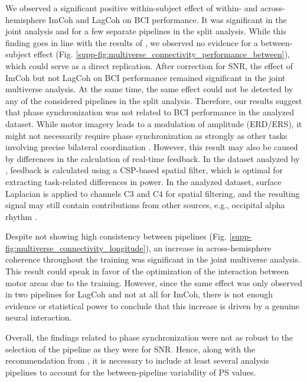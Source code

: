 We observed a significant positive within-subject effect of within- and across-hemisphere ImCoh and LagCoh on BCI performance. It was significant in the joint analysis and for a few separate pipelines in the split analysis. While this finding goes in line with the results of \citep{Vidaurre2020}, we observed no evidence for a between-subject effect (Fig. \ref{supp-fig:multiverse_connectivity_performance_between}), which could serve as a direct replication. After correction for SNR, the effect of ImCoh but not LagCoh on BCI performance remained significant in the joint multiverse analysis. At the same time, the same effect could not be detected by any of the considered pipelines in the split analysis. Therefore, our results suggest that phase synchronization was not related to BCI performance in the analyzed dataset. While motor imagery leads to a modulation of amplitude (ERD/ERS), it might not necessarily require phase synchronization as strongly as other tasks involving precise bilateral coordination \citep{Shih2021}. However, this result may also be caused by differences in the calculation of real-time feedback. In the dataset analyzed by \cite{Vidaurre2020}, feedback is calculated using a CSP-based spatial filter, which is optimal for extracting task-related differences in power. In the analyzed dataset, surface Laplacian is applied to channels C3 and C4 for spatial filtering, and the resulting signal may still contain contributions from other sources, e.g., occipital alpha rhythm \citep{Blankertz2010}.

\medskip

Despite not showing high consistency between pipelines (Fig. \ref{supp-fig:multiverse_connectivity_longitude}), an increase in across-hemisphere coherence throughout the training was significant in the joint multiverse analysis. This result could speak in favor of the optimization of the interaction between motor areas due to the training. However, since the same effect was only observed in two pipelines for LagCoh and not at all for ImCoh, there is not enough evidence or statistical power to conclude that this increase is driven by a genuine neural interaction. 

\medskip

Overall, the findings related to phase synchronization were not as robust to the selection of the pipeline as they were for SNR. Hence, along with the recommendation from \cite{Mahjoory2017}, it is necessary to include at least several analysis pipelines to account for the between-pipeline variability of PS values.

